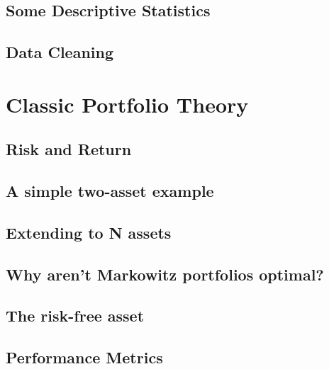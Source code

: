 \documentclass[12pt]{article} %
\numberwithin{equation}{subsection}
\begin{document}
\subsection{Some Descriptive Statistics}




\subsection{Data Cleaning}




\section{Classic Portfolio Theory}

\subsection{Risk and Return}



\subsection{A simple two-asset example}



\subsection{Extending to N assets}




\subsection{Why aren't Markowitz portfolios optimal?}




\subsection{The risk-free asset}




\subsection{Performance Metrics}
\end{document}
